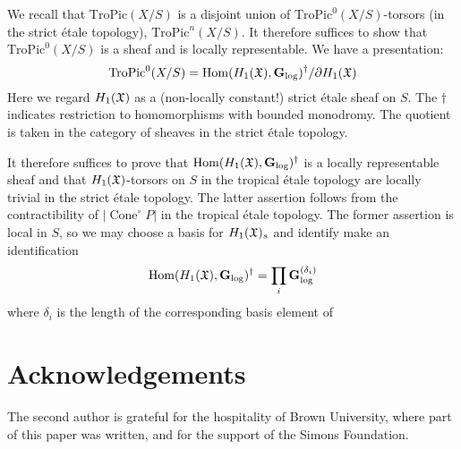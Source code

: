 \documentclass[12pt]{amsart}
\theoremstyle{definition}
\theoremstyle{remark}
\def\Hom{\operatorname{Hom}}
\def\Cone{\operatorname{Cone}}
\def\logGm{\mathbf{G}_{\log}}
\def\TroPic{\mathrm{TroPic}}
\begin{document}
We recall that $\TroPic(X/S)$ is a disjoint union of $\TroPic^0(X/S)$-torsors (in the strict \'etale topology), $\TroPic^n(X/S)$.  It therefore suffices to show that $\TroPic^0(X/S)$ is a sheaf and is locally representable.  We have a presentation:
\begin{equation}
\TroPic^0(X/S) = \Hom(H_1(\frak X), \logGm)^\dagger / \partial H_1(\frak X)
\end{equation}
Here we regard $H_1(\frak X)$ as a (non-locally constant!) strict \'etale sheaf on $S$.  The $\dagger$ indicates restriction to homomorphisms with bounded monodromy.  The quotient is taken in the category of sheaves in the strict \'etale topology.

It therefore suffices to prove that $\Hom(H_1(\frak X), \logGm)^\dagger$ is a locally representable sheaf and that $H_1(\frak X)$-torsors on $S$ in the tropical \'etale topology are locally trivial in the strict \'etale topology.  The latter assertion follows from the contractibility of $|\Cone^\circ P|$ in the tropical \'etale topology.  The former assertion is local in $S$, so we may choose a basis for $H_1(\frak X)_s$ and identify make an identification
\begin{equation}
\Hom(H_1(\frak X), \logGm)^\dagger = \prod_i \logGm^{(\delta_i)}
\end{equation}
where $\delta_i$ is the length of the corresponding basis element of 



\section{Acknowledgements}

The second author is grateful for the hospitality of Brown University, where part of this paper was written, and for the support of the Simons Foundation.
\end{document}
